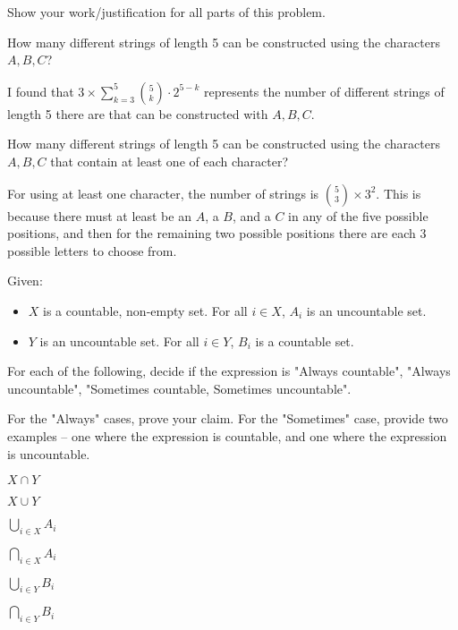 \documentclass[11pt]{article}
\begin{document}
Show your work/justification for all parts of this problem.
\begin{Parts}
    \Part How many different strings of length 5 can be constructed using the characters $A, B, C$?

    \begin{solution}
        I found that $3 \times \sum_{k=3}^{5} \binom{5}{k} \cdot 2^{5-k}$ represents
        the number of different strings of length 5 there are that can be constructed
        with $A, B, C$. 
    \end{solution}

    \Part How many different strings of length 5 can be constructed using the characters $A, B, C$ that contain at least one of each character?

    \begin{solution}
        For using at least one character, the number of strings is $\binom{5}{3} \times 3^2$.
        This is because there must at least be an $A$, a $B$, and a $C$ in any of the five 
        possible positions, and then for the remaining two possible positions there are each
        3 possible letters to choose from. 
    \end{solution}
\end{Parts}


Given:
\begin{itemize}
\item $X$ is a countable, non-empty set. For all $i \in X$, $A_i$ is an uncountable set.
\item $Y$ is an uncountable set. For all $i \in Y$, $B_i$ is a countable set.
\end{itemize}

For each of the following, decide if the expression is
"Always countable", "Always uncountable", "Sometimes countable,
Sometimes uncountable".

For the "Always" cases, prove your claim. For the "Sometimes" case, provide
two examples -- one where the expression is countable, and one where
the expression is uncountable.

\begin{Parts}

\Part $X \cap Y$


\Part $X \cup Y$

	
\Part $\bigcup_{i \in X} A_i$


\Part $\bigcap_{i \in X} A_i$


\Part $\bigcup_{i \in Y} B_i$


\Part $\bigcap_{i \in Y} B_i$




\end{Parts}
\end{document}
